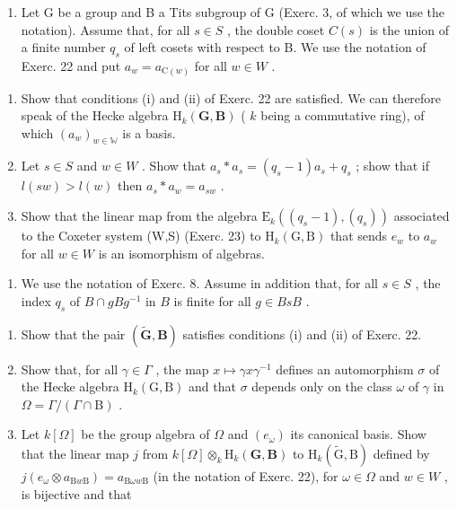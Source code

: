 \begin{enumerate}
\def\labelenumi{\arabic{enumi})}
\setcounter{enumi}{23}
\tightlist
\item
  Let G be a group and B a Tits subgroup of G (Exerc. 3, of which we use the notation). Assume that, for all \(s \in S\) , the double coset \(C(s)\) is the union of a finite number \(q_{s}\) of left cosets with respect to B. We use the notation of Exerc. 22 and put \(a_{w} = a_{\mathrm{C}(w)}\) for all \(w \in W\) .
\end{enumerate}

\begin{enumerate}
\def\labelenumi{\alph{enumi})}
\item
  Show that conditions (i) and (ii) of Exerc. 22 are satisfied. We can therefore speak of the Hecke algebra \(\mathrm{H}_k(\mathbf{G},\mathbf{B})\) ( \(k\) being a commutative ring), of which \((a_w)_{w\in \mathbb{W}}\) is a basis.
\item
  Let \(s \in S\) and \(w \in W\) . Show that \(a_s * a_s = (q_s - 1)a_s + q_s\) ; show that if \(l(sw) > l(w)\) then \(a_s * a_w = a_{sw}\) .
\item
  Show that the linear map from the algebra \(\mathrm{E}_{k}((q_{s}-1),(q_{s}))\) associated to the Coxeter system (W,S) (Exerc. 23) to \(\mathrm{H}_{k}(\mathrm{G},\mathrm{B})\) that sends \(e_{w}\) to \(a_{w}\) for all \(w \in W\) is an isomorphism of algebras.
\end{enumerate}

\begin{enumerate}
\def\labelenumi{\arabic{enumi})}
\setcounter{enumi}{24}
\tightlist
\item
  We use the notation of Exerc. 8. Assume in addition that, for all \(s \in S\) , the index \(q_s\) of \(B \cap gBg^{-1}\) in \(B\) is finite for all \(g \in BsB\) .
\end{enumerate}

\begin{enumerate}
\def\labelenumi{\alph{enumi})}
\item
  Show that the pair \((\tilde{\mathbf{G}},\mathbf{B})\) satisfies conditions (i) and (ii) of Exerc. 22.
\item
  Show that, for all \(\gamma \in \Gamma\) , the map \(x \mapsto \gamma x \gamma^{-1}\) defines an automorphism \(\sigma\) of the Hecke algebra \(\mathrm{H}_k(\mathrm{G}, \mathrm{B})\) and that \(\sigma\) depends only on the class \(\omega\) of \(\gamma\) in \(\Omega = \Gamma / (\Gamma \cap \mathrm{B})\) .
\item
  Let \(k[\Omega]\) be the group algebra of \(\Omega\) and \((e_{\omega})\) its canonical basis. Show that the linear map \(j\) from \(k[\Omega] \otimes_k \mathrm{H}_k(\mathbf{G}, \mathbf{B})\) to \(\mathrm{H}_k(\tilde{\mathrm{G}}, \mathrm{B})\) defined by \(j(e_{\omega} \otimes a_{\mathrm{B}w\mathrm{B}}) = a_{\mathrm{B}\omega w\mathrm{B}}\) (in the notation of Exerc. 22), for \(\omega \in \Omega\) and \(w \in W\) , is bijective and that
\end{enumerate}

